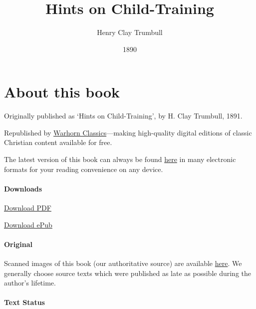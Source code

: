 \documentclass[
]{book}
\title{Hints on Child-Training}
\author{Henry Clay Trumbull}
\date{1890}
\begin{document}
\maketitle

\mainmatter
{}

{
\setcounter{tocdepth}{1}
\tableofcontents
}
\hypertarget{about-this-book}{%
\chapter*{About this book}\label{about-this-book}}

Originally published as `Hints on Child-Training', by H. Clay Trumbull, 1891.

Republished by \href{https://classics.warhornmedia.com/}{Warhorn Classics}---making high-quality digital editions of classic Christian content available for free.

The latest version of this book can always be found \href{https://warhornmedia.github.io/trumbull-child-training/}{here} in many electronic formats for your reading convenience on any device.

\hypertarget{downloads}{%
\subsubsection*{Downloads}\label{downloads}}

\href{https://warhornmedia.github.io/trumbull-child-training//Trumbull-Hints_on_Child_Training.pdf}{Download PDF}

\href{https://warhornmedia.github.io/trumbull-child-training//Trumbull-Hints_on_Child_Training.epub}{Download ePub}

\hypertarget{original}{%
\subsubsection*{Original}\label{original}}

Scanned images of this book (our authoritative source) are available \href{https://archive.org/details/hintsonchildtrai00trum}{here}. We generally choose source texts which were published as late as possible during the author's lifetime.

\hypertarget{text-status}{%
\subsubsection*{Text Status}\label{text-status}}
\end{document}
